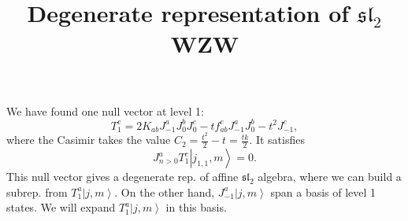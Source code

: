 \documentclass[10pt,a4paper]{article}
\numberwithin{equation}{section}
\newcommand{\ket}[1]{\left| #1 \right\rangle}
\begin{document}
\title{Degenerate representation of $\mathfrak{sl}_{2}$ WZW}
\maketitle

We have found one null vector at level 1: 
\begin{equation}
    T^{c}_{1} = 2 K_{ab} J^{a}_{-1} J^{b}_{0} J^{c}_{0} - t f^{c}_{ab} J^{a}_{-1} J^{b}_{0} - t^{2} J^{c}_{-1},
\end{equation}
where the Casimir takes the value $C_{2} = \frac{t^{2}}{2} - t = \frac{tk}{2}$. It satisfies 
\begin{equation}
    J^{a}_{n>0} T^{c}_{1} \ket{j_{1,1},m} = 0.
\end{equation}
This null vector gives a degenerate rep. of affine $\mathfrak{sl}_{2} $ algebra, where we can build a subrep.
from $T^{a}_{1} \ket{j,m}$. On the other hand, $J^{a}_{-1}\ket{j,m}$ span a basis of level 1 states. We will expand $T^{a}_{1} \ket{j,m}$ in this basis. \\
\end{document}
